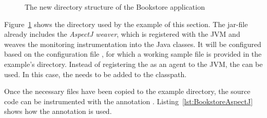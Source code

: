 
\begin{figure}[H]
\begin{graybox}
\end{graybox}

\caption{The new directory structure of the Bookstore application}
\label{fig:bookstoreAOP:dirStructure}
\end{figure}

Figure~\ref{fig:bookstoreAOP:dirStructure} shows the directory used by the example of this section. %
The jar-file \file{\mainJarWeaver} already includes the \textit{AspectJ weaver}, %
which is registered with the JVM and weaves the monitoring instrumentation into %
the Java classes. It will be configured based on the configuration file %
\file{\file{\aopConfigFile}}, for which a working sample file is provided in the %
example's  directory. Instead of registering the \file{\mainJarWeaver} %
as an agent to the JVM, the \file{\aspectJWeaverJar} can be used. In this case, %
the \file{\mainJar} needs to be added to the classpath.

\pagebreak

Once the necessary files have been copied to the example directory, the source code can be instrumented with the annotation
. Listing~\ref{lst:BookstoreAspectJ} shows how the annotation is used.

